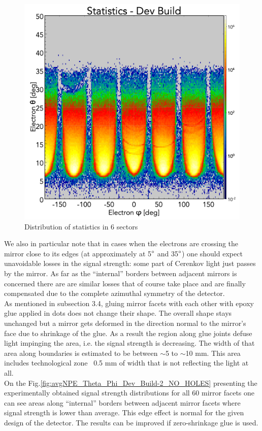 \begin{figure}[!h]
    \centering
    \includegraphics[width=1.0\linewidth,trim={0.0cm 0.0cm 0.0cm 1.67cm},clip]{images/statistics_Theta_Phi_Dev_Build_NO_HOLES.png}
    \caption{Distribution of statistics in 6 sectors}
    \label{fig:statistics_Theta_Phi_Dev_Build_NO_HOLES}
\end{figure}
We also in particular note that in cases when the electrons are crossing the mirror close to its edges (at approximately at 5$\degree$ and 35$\degree$) one should expect unavoidable losses in the signal strength: some part of Cerenkov light just passes by the mirror. As far as the “internal” borders between adjacent mirrors is concerned there are are similar losses that of course take place and are finally compensated due to the complete azimuthal symmetry of the detector.\\
\indent As mentioned in subsection 3.4, gluing mirror facets with each other with epoxy glue applied in dots does not change their shape. The overall shape stays unchanged but a mirror gets deformed in the direction normal to the mirror’s face due to shrinkage of the glue. As a result the region along glue joints defuse light impinging the area, i.e. the signal strength is decreasing. The width of that area along boundaries is estimated to be between $\sim$5 to $\sim$10 mm. This area includes technological zone ~0.5 mm of width that is not reflecting the light at all.\\
\indent On the Fig.\ref{fig:avgNPE_Theta_Phi_Dev_Build-2_NO_HOLES} presenting the experimentally obtained signal strength distributions for all 60 mirror facets one can see areas along “internal” borders between adjacent mirror facets where signal strength is lower than average. This edge effect is normal for the given design of the detector. The results can be improved if zero-shrinkage glue is used. 
